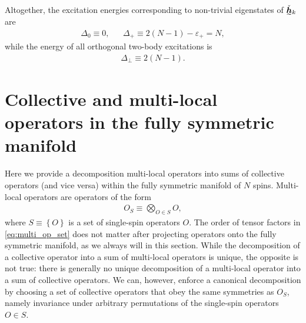 \documentclass[nofootinbib,notitlepage,11pt]{revtex4-2}
\newcommand{\p}[1]{\left(#1\right)} %
\renewcommand{\set}[1]{\left\{#1\right\}} %
\newcommand{\m}{\bm} %
\newcommand{\1}{\mathds{1}}
\newcommand{\ut}{\undertilde}
\begin{document}
Altogether, the excitation energies corresponding to non-trivial
eigenstates of $\ut{\check{\m h}}_k$ are
\begin{align}
  \Delta_0 \equiv 0,
  &&
  \Delta_+ \equiv 2\p{N-1} - \varepsilon_+ = N,
\end{align}
while the energy of all orthogonal two-body excitations is
\begin{align}
  \Delta_\perp \equiv 2\p{N-1}.
\end{align}

\section{Collective and multi-local operators in the fully symmetric
  manifold}
\label{sec:multi_to_collective}

Here we provide a decomposition multi-local operators into sums of
collective operators (and vice versa) within the fully symmetric
manifold of $N$ spins.  Multi-local operators are operators of the
form
\begin{align}
  O_S \equiv \bigotimes_{O\in S} O,
  \label{eq:multi_op_set}
\end{align}
where $S\equiv\set{O}$ is a set of single-spin operators $O$.  The
order of tensor factors in \eqref{eq:multi_op_set} does not matter
after projecting operators onto the fully symmetric manifold, as we
always will in this section.  While the decomposition of a collective
operator into a sum of multi-local operators is unique, the opposite
is not true: there is generally no unique decomposition of a
multi-local operator into a sum of collective operators.  We can,
however, enforce a canonical decomposition by choosing a set of
collective operators that obey the same symmetries as $O_S$, namely
invariance under arbitrary permutations of the single-spin operators
$O\in S$.
\end{document}
